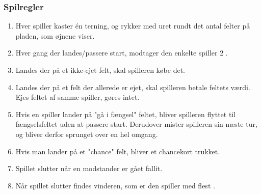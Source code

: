 \smallskip
\subsubsection{Spilregler}
\begin{enumerate}
    \item Hver spiller kaster én terning, og rykker med uret rundt det antal felter på pladen, som øjnene viser.
    \item Hver gang der landes/passere start, modtager den enkelte spiller 2 {}.
    \item Landes der på et ikke-ejet felt, skal spilleren købe det.
    \item Landes der på et felt der allerede er ejet, skal spilleren betale feltets værdi. Ejes feltet af samme spiller, gøres intet.
    \item Hvis en spiller lander på "gå i fængsel" feltet, bliver spilleren flyttet til fængselsfeltet uden at passere start. Derudover mister spilleren sin næste tur, og bliver derfor sprunget over en hel omgang.
    \item Hvis man lander på et "chance" felt, bliver et chancekort trukket.
    
    \item Spillet slutter når en modstander er gået fallit. 
    \item Når spillet slutter findes vinderen, som er den spiller med flest {}.
\end{enumerate}



\bigskip



